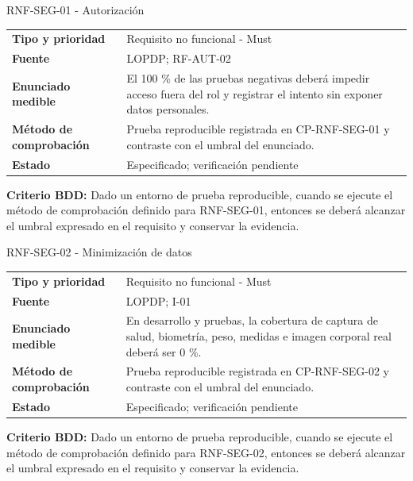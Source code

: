 \begin{reqbox}[colframe=Teal]{RNF-SEG-01 - Autorización}
\begin{tabularx}{\textwidth}{>{\bfseries}p{3.2cm}Y}
Tipo y prioridad & Requisito no funcional - Must \\
Fuente & LOPDP; RF-AUT-02 \\
Enunciado medible & El 100 \% de las pruebas negativas deberá impedir acceso fuera del rol y registrar el intento sin exponer datos personales. \\
Método de comprobación & Prueba reproducible registrada en CP-RNF-SEG-01 y contraste con el umbral del enunciado. \\
Estado & Especificado; verificación pendiente \\
\end{tabularx}
\textbf{Criterio BDD:} Dado un entorno de prueba reproducible, cuando se ejecute el método de comprobación definido para RNF-SEG-01, entonces se deberá alcanzar el umbral expresado en el requisito y conservar la evidencia.
\end{reqbox}


\begin{reqbox}[colframe=Teal]{RNF-SEG-02 - Minimización de datos}
\begin{tabularx}{\textwidth}{>{\bfseries}p{3.2cm}Y}
Tipo y prioridad & Requisito no funcional - Must \\
Fuente & LOPDP; I-01 \\
Enunciado medible & En desarrollo y pruebas, la cobertura de captura de salud, biometría, peso, medidas e imagen corporal real deberá ser 0 \%. \\
Método de comprobación & Prueba reproducible registrada en CP-RNF-SEG-02 y contraste con el umbral del enunciado. \\
Estado & Especificado; verificación pendiente \\
\end{tabularx}
\textbf{Criterio BDD:} Dado un entorno de prueba reproducible, cuando se ejecute el método de comprobación definido para RNF-SEG-02, entonces se deberá alcanzar el umbral expresado en el requisito y conservar la evidencia.
\end{reqbox}


